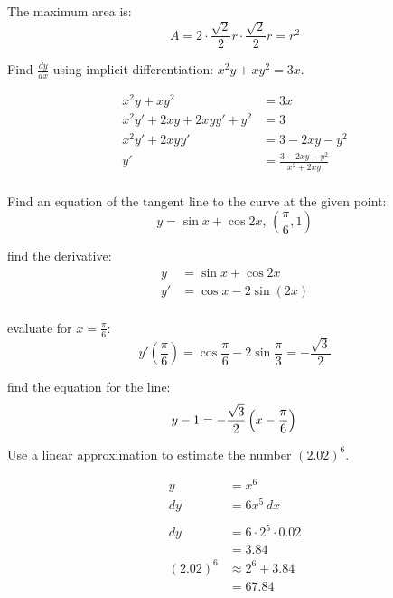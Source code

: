 \documentclass[fleqn,addpoints]{exam}
\begin{document}
\begin{questions}
\begin{solution}
The maximum area is:
\[
  A = 2 \cdot \frac{\sqrt{2}}{2} r \cdot \frac{\sqrt{2}}{2} r = r^2
\]
\end{solution}

\ifprintanswers
\pagebreak
\fi

\question Find $\frac{dy}{dx}$ using implicit differentiation: $x^2y + xy^2 = 3x$.

\begin{solution}
\begin{align*}
  x^2y + xy^2 &= 3x \\
  x^2y' + 2xy + 2xyy' + y^2 &= 3 \\
  x^2y' + 2xyy'  &= 3 - 2xy - y^2 \\
  y' &= \frac{3 - 2xy - y^2}{x^2 + 2xy} \\
\end{align*}

\end{solution}

\question
Find an equation of the tangent line to the curve at the given point:
\[
  y = \sin x + \cos 2x \text{, } \left( \frac{\pi}{6}, 1 \right)
\]

\begin{solution}
find the derivative:
\begin{align*}
  y  &= \sin x + \cos 2x \\
  y' &= \cos x - 2 \sin (2x) \\
\end{align*}

evaluate for $x = \frac{\pi}{6}$:
\[
  y'\left( \frac{\pi}{6} \right) = \cos \frac{\pi}{6} - 2 \sin \frac{\pi}{3} = - \frac{\sqrt{3}}{2}
\]

find the equation for the line:
\[
  y - 1 = - \frac{\sqrt{3}}{2} \left(x - \frac{\pi}{6} \right) \\
\]

\end{solution}

\ifprintanswers
\pagebreak
\fi

\question Use a linear approximation to estimate the number $(2.02)^6$.
\begin{solution}
\begin{align*}
  y &= x^6 \\
  dy &= 6x^5 \, dx \\
\\
  dy &= 6 \cdot 2^5 \cdot 0.02 \\
     &= 3.84
\\
  (2.02)^6 &\approx 2^6 + 3.84 \\
  &= 67.84 \\
\end{align*}


\end{solution}
\end{questions}
\end{document}

